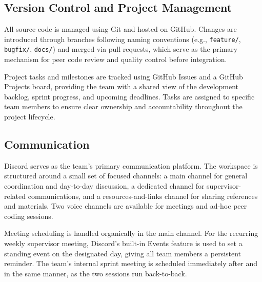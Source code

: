 \documentclass[12pt, a4paper]{article}
\begin{document}
\subsection{Version Control and Project Management}
All source code is managed using Git and hosted on GitHub. Changes are introduced through branches following naming conventions (e.g., \texttt{feature/}, \texttt{bugfix/}, \texttt{docs/}) and merged via pull requests, which serve as the primary mechanism for peer code review and quality control before integration.

Project tasks and milestones are tracked using GitHub Issues and a GitHub Projects board, providing the team with a shared view of the development backlog, sprint progress, and upcoming deadlines. Tasks are assigned to specific team members to ensure clear ownership and accountability throughout the project lifecycle.

\subsection{Communication}
Discord serves as the team's primary communication platform. The workspace is structured around a small set of focused channels: a main channel for general coordination and day-to-day discussion, a dedicated channel for supervisor-related communications, and a resources-and-links channel for sharing references and materials. Two voice channels are available for meetings and ad-hoc peer coding sessions.

Meeting scheduling is handled organically in the main channel. For the recurring weekly supervisor meeting, Discord's built-in Events feature is used to set a standing event on the designated day, giving all team members a persistent reminder. The team's internal sprint meeting is scheduled immediately after and in the same manner, as the two sessions run back-to-back.
\end{document}
